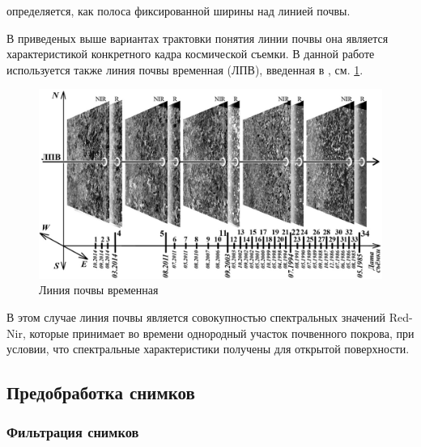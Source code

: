 \documentclass[14pt]{extarticle}
\begin{document}
определяется, как полоса фиксированной ширины над линией почвы.
\par
В приведеных выше вариантах трактовки понятия линии почвы она является характеристикой
конкретного кадра космической съемки. В данной работе используется также линия почвы 
временная (ЛПВ), введенная в \cite{rukhovich-1}, см. \ref{image:soil_line_time}. 
\begin{figure}[H]
\centering
\includegraphics[width=\linewidth]{imgs/soil_line_time.png}
\caption{Линия почвы временная}
\label{image:soil_line_time}
\end{figure}
В этом случае линия почвы является совокупностью спектральных значений Red-Nir,
которые принимает во времени однородный участок почвенного покрова, при условии, что
спектральные характеристики получены для открытой поверхности.

\subsection{Предобработка снимков}

\subsubsection{Фильтрация снимков}
\end{document}
